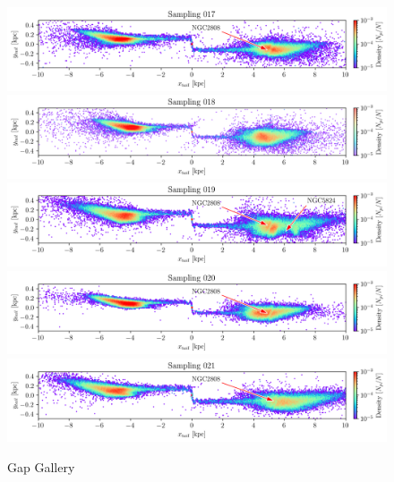 \documentclass[draft]{aa}
\begin{document}
\begin{appendix}
    \begin{figure}
      \centering
      \includegraphics[width=\linewidth]{gallery_of_gaps_monte-carlo-017.png}
      \includegraphics[width=\linewidth]{gallery_of_gaps_monte-carlo-018.png}
      \includegraphics[width=\linewidth]{gallery_of_gaps_monte-carlo-019.png}      
      \includegraphics[width=\linewidth]{gallery_of_gaps_monte-carlo-020.png}
      \includegraphics[width=\linewidth]{gallery_of_gaps_monte-carlo-021.png}
      \caption{Gap Gallery}
      \label{fig:gallery4}
      \end{figure}        


\end{appendix}
\end{document}
